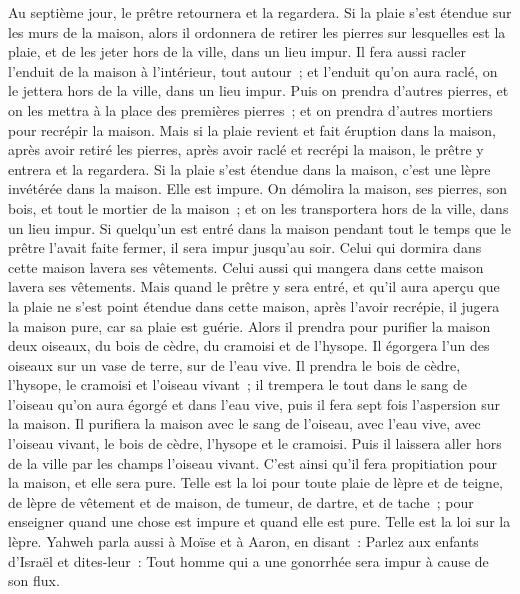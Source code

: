 \begin{multicols}{2}
Au septième jour, le prêtre retournera et la regardera. Si la plaie s'est étendue sur les murs de la maison,
alors il ordonnera de retirer les pierres sur lesquelles est la plaie, et de les jeter hors de la ville, dans un lieu impur.
Il fera aussi racler l'enduit de la maison à l'intérieur, tout autour~; et l'enduit qu'on aura raclé, on le jettera hors de la ville, dans un lieu impur.
Puis on prendra d'autres pierres, et on les mettra à la place des premières pierres~; et on prendra d'autres mortiers pour recrépir la maison.
Mais si la plaie revient et fait éruption dans la maison, après avoir retiré les pierres, après avoir raclé et recrépi la maison,
le prêtre y entrera et la regardera. Si la plaie s'est étendue dans la maison, c'est une lèpre invétérée dans la maison. Elle est impure.
On démolira la maison, ses pierres, son bois, et tout le mortier de la maison~; et on les transportera hors de la ville, dans un lieu impur.
Si quelqu'un est entré dans la maison pendant tout le temps que le prêtre l'avait faite fermer, il sera impur jusqu'au soir.
Celui qui dormira dans cette maison lavera ses vêtements. Celui aussi qui mangera dans cette maison lavera ses vêtements.
Mais quand le prêtre y sera entré, et qu'il aura aperçu que la plaie ne s'est point étendue dans cette maison, après l'avoir recrépie, il jugera la maison pure, car sa plaie est guérie.
Alors il prendra pour purifier la maison deux oiseaux, du bois de cèdre, du cramoisi et de l'hysope.
Il égorgera l'un des oiseaux sur un vase de terre, sur de l'eau vive.
Il prendra le bois de cèdre, l'hysope, le cramoisi et l'oiseau vivant~; il trempera le tout dans le sang de l'oiseau qu'on aura égorgé et dans l'eau vive, puis il fera sept fois l'aspersion sur la maison.
Il purifiera la maison avec le sang de l'oiseau, avec l'eau vive, avec l'oiseau vivant, le bois de cèdre, l'hysope et le cramoisi.
Puis il laissera aller hors de la ville par les champs l'oiseau vivant. C'est ainsi qu'il fera propitiation pour la maison, et elle sera pure.
Telle est la loi pour toute plaie de lèpre et de teigne,
de lèpre de vêtement et de maison,
de tumeur, de dartre, et de tache~;
pour enseigner quand une chose est impure et quand elle est pure. Telle est la loi sur la lèpre.
\VerseOne{}Yahweh parla aussi à Moïse et à Aaron, en disant~:
Parlez aux enfants d'Israël et dites-leur~: Tout homme qui a une gonorrhée sera impur à cause de son flux.

\end{multicols}
